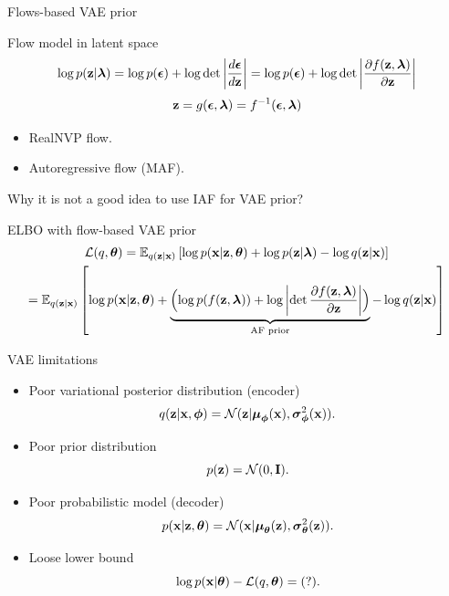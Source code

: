 \begin{frame}{Flows-based VAE prior}
	\begin{block}{Flow model in latent space}
		\vspace{-0.3cm}
		\[
			\log p(\mathbf{z} | \boldsymbol{\lambda}) = \log p(\boldsymbol{\epsilon}) + \log \det \left | \frac{d \boldsymbol{\epsilon}}{d\mathbf{z}}\right| = \log p(\boldsymbol{\epsilon}) + \log \det \left | \frac{\partial f(\mathbf{z}, \boldsymbol{\lambda})}{\partial \mathbf{z}}\right| 
		\]
		\[
			\mathbf{z} = g(\boldsymbol{\epsilon}, \boldsymbol{\lambda}) = f^{-1}(\boldsymbol{\epsilon}, \boldsymbol{\lambda})
		\]
	\end{block}
	\vspace{-0.3cm}
	\begin{itemize}
		\item RealNVP flow.
		\item Autoregressive flow (MAF).
	\end{itemize}
	Why it is not a good idea to use IAF for VAE prior?
	\begin{block}{ELBO with flow-based VAE prior}
		\vspace{-0.3cm}
		{\small
		\begin{multline*}
			\mathcal{L}(q, \boldsymbol{\theta}) = \mathbb{E}_{q(\mathbf{z} | \mathbf{x})} \left[ \log p(\mathbf{x} | \mathbf{z}, \boldsymbol{\theta}) +  \log p(\mathbf{z} | \boldsymbol{\lambda}) - \log q(\mathbf{z} | \mathbf{x}) \right] \\
				= \mathbb{E}_{q(\mathbf{z} | \mathbf{x})} \left[ \log p(\mathbf{x} | \mathbf{z}, \boldsymbol{\theta}) + \underbrace{ \Bigl( \log p(f(\mathbf{z}, \boldsymbol{\lambda})) + \log \left| \det \frac{\partial f(\mathbf{z}, \boldsymbol{\lambda})}{\partial \mathbf{z}} \right| \Bigr) }_{\text{AF prior}} - \log q(\mathbf{z} | \mathbf{x}) \right] 
		\end{multline*}
		}
	\end{block}
\end{frame}
\begin{frame}{VAE limitations}
	\begin{itemize}
		\item Poor variational posterior distribution (encoder)
		\[
			q(\mathbf{z} | \mathbf{x}, \boldsymbol{\phi}) = \mathcal{N}(\mathbf{z}| \boldsymbol{\mu}_{\boldsymbol{\phi}}(\mathbf{x}), \boldsymbol{\sigma}^2_{\boldsymbol{\phi}}(\mathbf{x})).
		\]
		\item Poor prior distribution
		\[
			p(\mathbf{z}) = \mathcal{N}(0, \mathbf{I}).
		\]
		\item Poor probabilistic model (decoder)
		\[
			p(\mathbf{x} | \mathbf{z}, \boldsymbol{\theta}) = \mathcal{N}(\mathbf{x}| \boldsymbol{\mu}_{\boldsymbol{\theta}}(\mathbf{z}), \boldsymbol{\sigma}^2_{\boldsymbol{\theta}}(\mathbf{z})).
		\]
		\item Loose lower bound
		\[
			\log p(\mathbf{x} | \boldsymbol{\theta}) - \mathcal{L}(q, \boldsymbol{\theta}) = (?).
		\]
	\end{itemize}
\end{frame}
